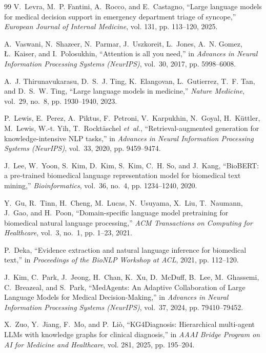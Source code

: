 \documentclass[conference]{IEEEtran}
\begin{document}
\begin{thebibliography}{99}
V.~Levra, M.~P. Fantini, A.~Rocco, and E.~Castagno, ``Large language models for medical decision support in emergency department triage of syncope,'' \emph{European Journal of Internal Medicine}, vol. 131, pp. 113--120, 2025.

A.~Vaswani, N.~Shazeer, N.~Parmar, J.~Uszkoreit, L.~Jones, A.~N. Gomez, {\L}.~Kaiser, and I.~Polosukhin, ``Attention is all you need,'' in \emph{Advances in Neural Information Processing Systems (NeurIPS)}, vol.~30, 2017, pp. 5998--6008.

A.~J. Thirunavukarasu, D.~S.~J. Ting, K.~Elangovan, L.~Gutierrez, T.~F. Tan, and D.~S.~W. Ting, ``Large language models in medicine,'' \emph{Nature Medicine}, vol.~29, no.~8, pp. 1930--1940, 2023.

P.~Lewis, E.~Perez, A.~Piktus, F.~Petroni, V.~Karpukhin, N.~Goyal, H.~K{\"u}ttler, M.~Lewis, W.-t. Yih, T.~Rockt{\"a}schel \emph{et~al.}, ``Retrieval-augmented generation for knowledge-intensive NLP tasks,'' in \emph{Advances in Neural Information Processing Systems (NeurIPS)}, vol.~33, 2020, pp. 9459--9474.

J.~Lee, W.~Yoon, S.~Kim, D.~Kim, S.~Kim, C.~H. So, and J.~Kang, ``BioBERT: a pre-trained biomedical language representation model for biomedical text mining,'' \emph{Bioinformatics}, vol.~36, no.~4, pp. 1234--1240, 2020.

Y.~Gu, R.~Tinn, H.~Cheng, M.~Lucas, N.~Usuyama, X.~Liu, T.~Naumann, J.~Gao, and H.~Poon, ``Domain-specific language model pretraining for biomedical natural language processing,'' \emph{ACM Transactions on Computing for Healthcare}, vol.~3, no.~1, pp. 1--23, 2021.

P.~Deka, ``Evidence extraction and natural language inference for biomedical text,'' in \emph{Proceedings of the BioNLP Workshop at ACL}, 2021, pp. 112--120.

J.~Kim, C.~Park, J.~Jeong, H.~Chan, K.~Xu, D.~McDuff, B.~Lee, M.~Ghassemi, C.~Breazeal, and S.~Park, ``MedAgents: An Adaptive Collaboration of Large Language Models for Medical Decision-Making,'' in \emph{Advances in Neural Information Processing Systems (NeurIPS)}, vol.~37, 2024, pp. 79410--79452.

X.~Zuo, Y.~Jiang, F.~Mo, and P.~Li{\`o}, ``KG4Diagnosis: Hierarchical multi-agent LLMs with knowledge graphs for clinical diagnosis,'' in \emph{AAAI Bridge Program on AI for Medicine and Healthcare}, vol. 281, 2025, pp. 195--204.


\end{thebibliography}
\end{document}

